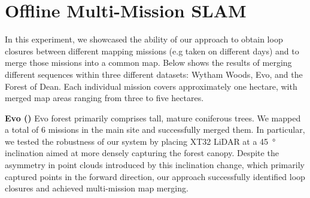 \section{Offline Multi-Mission SLAM} 
\label{sec:offline_multi_mission}
In this experiment, we showcased the ability of our approach to obtain loop closures between different mapping missions (e.g taken on different days) and to merge those missions into a common map. Below shows the results of merging different sequences within three different datasets: Wytham Woods, Evo, and the Forest of Dean. Each individual mission covers approximately one hectare, with merged map areas ranging from three to five hectares. 
\vspace{5pt}

\noindent \textbf{Evo ()}\hspace{0.5em}  Evo forest primarily comprises tall, mature coniferous trees. We mapped a total of 6 missions in the main site and successfully merged them. In particular, we tested the robustness of our system by placing XT32 LiDAR at a \SI{45}{\degree} inclination aimed at more densely capturing the forest canopy. Despite the asymmetry in point clouds introduced by this inclination change, which primarily captured points in the forward direction, our approach successfully identified loop closures and achieved multi-mission map merging.
